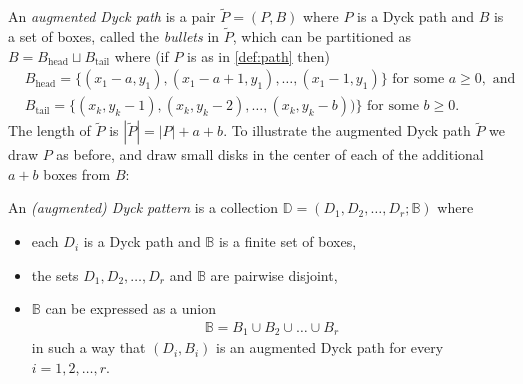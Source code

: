 \documentclass[12pt]{amsart}
\theoremstyle{definition}
\theoremstyle{remark}
\newcommand{\bbB}{\mathbb{B}}
\newcommand{\bbD}{\mathbb{D}}
\numberwithin{equation}{section}
\begin{document}
An \emph{augmented Dyck path} is a pair $\tilde{P} = (P,B)$ where $P$ is a Dyck path and $B$ is a set of boxes, called the \emph{bullets} in $\tilde{P}$, which can be partitioned as $B = B_{\text{head}} \sqcup B_{\text{tail}}$ where (if $P$ is as in \ref{def:path} then)
\begin{equation}
\begin{aligned}
& B_{\text{head}} = \{ (x_1 - a,y_1),(x_1-a+1,y_1),\ldots,(x_1-1,y_1) \} \text{ for some } a \geq 0, \text{ and } \\
& B_{\text{tail}} = \{ (x_k,y_k-1),(x_k,y_k-2),\ldots,(x_k,y_k-b)) \} \text{ for some } b \geq 0.
\end{aligned}
\end{equation}
The length of $\tilde{P}$ is $|\tilde{P}| = |P| + a + b$. To illustrate the augmented Dyck path $\tilde{P}$ we draw $P$ as before, and draw small disks in the center of each of the additional $a+b$ boxes from $B$:
\begin{center}
\captionsetup{labelformat=empty}
\end{center}

An \emph{(augmented) Dyck pattern} is a collection $\bbD = (D_1,D_2,\ldots,D_r;\bbB)$ where
\begin{itemize}
    \item each $D_i$ is a Dyck path and $\bbB$ is a finite set of boxes,
    \item the sets $D_1,D_2,\ldots,D_r$ and $\bbB$ are pairwise disjoint,
    \item $\bbB$ can be expressed as a union
    \begin{align} \label{def:dyckpattern}
        \bbB = B_1 \cup B_2 \cup \ldots \cup B_r
    \end{align}
    in such a way that $(D_i,B_i)$ is an augmented Dyck path for every $i = 1,2,\ldots,r$.
\end{itemize}
\end{document}
